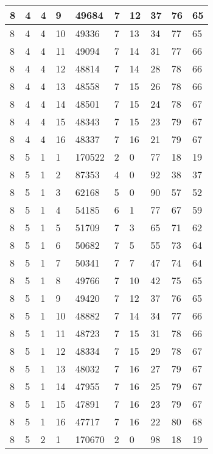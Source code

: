 \begin{table}[!ht]
\begin{tabular}{|l|l|l|l|l|l|l|l|l|l|}
        8 & 4 & 4 & 9 & 49684 & 7 & 12 & 37 & 76 & 65 \\ \hline
        8 & 4 & 4 & 10 & 49336 & 7 & 13 & 34 & 77 & 65 \\ \hline
        8 & 4 & 4 & 11 & 49094 & 7 & 14 & 31 & 77 & 66 \\ \hline
        8 & 4 & 4 & 12 & 48814 & 7 & 14 & 28 & 78 & 66 \\ \hline
        8 & 4 & 4 & 13 & 48558 & 7 & 15 & 26 & 78 & 66 \\ \hline
        8 & 4 & 4 & 14 & 48501 & 7 & 15 & 24 & 78 & 67 \\ \hline
        8 & 4 & 4 & 15 & 48343 & 7 & 15 & 23 & 79 & 67 \\ \hline
        8 & 4 & 4 & 16 & 48337 & 7 & 16 & 21 & 79 & 67 \\ \hline
        8 & 5 & 1 & 1 & 170522 & 2 & 0 & 77 & 18 & 19 \\ \hline
        8 & 5 & 1 & 2 & 87353 & 4 & 0 & 92 & 38 & 37 \\ \hline
        8 & 5 & 1 & 3 & 62168 & 5 & 0 & 90 & 57 & 52 \\ \hline
        8 & 5 & 1 & 4 & 54185 & 6 & 1 & 77 & 67 & 59 \\ \hline
        8 & 5 & 1 & 5 & 51709 & 7 & 3 & 65 & 71 & 62 \\ \hline
        8 & 5 & 1 & 6 & 50682 & 7 & 5 & 55 & 73 & 64 \\ \hline
        8 & 5 & 1 & 7 & 50341 & 7 & 7 & 47 & 74 & 64 \\ \hline
        8 & 5 & 1 & 8 & 49766 & 7 & 10 & 42 & 75 & 65 \\ \hline
        8 & 5 & 1 & 9 & 49420 & 7 & 12 & 37 & 76 & 65 \\ \hline
        8 & 5 & 1 & 10 & 48882 & 7 & 14 & 34 & 77 & 66 \\ \hline
        8 & 5 & 1 & 11 & 48723 & 7 & 15 & 31 & 78 & 66 \\ \hline
        8 & 5 & 1 & 12 & 48334 & 7 & 15 & 29 & 78 & 67 \\ \hline
        8 & 5 & 1 & 13 & 48032 & 7 & 16 & 27 & 79 & 67 \\ \hline
        8 & 5 & 1 & 14 & 47955 & 7 & 16 & 25 & 79 & 67 \\ \hline
        8 & 5 & 1 & 15 & 47891 & 7 & 16 & 23 & 79 & 67 \\ \hline
        8 & 5 & 1 & 16 & 47717 & 7 & 16 & 22 & 80 & 68 \\ \hline
        8 & 5 & 2 & 1 & 170670 & 2 & 0 & 98 & 18 & 19 \\ \hline

\end{tabular}
\end{table}
